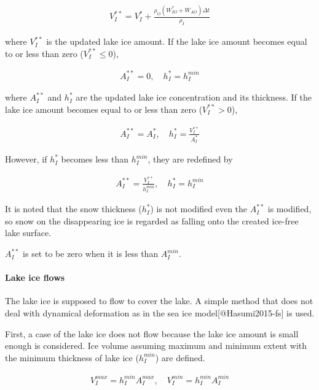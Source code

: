 \begin{eqnarray}
    V_I^{\ast\ast} = V_I^{\ast} + \frac{\rho_O (W_{IO}^\ast+W_{AO})\Delta t}{\rho_I}
\end{eqnarray}

where \(V_I^{\ast\ast}\) is the updated lake ice amount. If the lake ice amount becomes equal to or less than zero (\(V_I^{\ast\ast}\le0\)),

\begin{eqnarray}
  A_I^{\ast\ast}=0, \quad h_I^{\ast}=h_I^{min}
\end{eqnarray}

where \(A_I^{\ast\ast}\) and \(h_I^\ast\) are the updated lake ice concentration and its thickness. If the lake ice amount becomes equal to or less than zero (\(V_I^{\ast\ast}>0\)),

\begin{eqnarray}
  A_I^{\ast\ast}=A_I^\ast, \quad h_I^{\ast}=\frac{V_{I}^{\ast\ast}}{A_I^{\ast}}
\end{eqnarray}

However, if \(h_I^{\ast}\) becomes less than \(h_I^{min}\), they are redefined by

\begin{eqnarray}
  A_I^{\ast\ast}=\frac{V_I^{\ast\ast}}{h_I^{min}},\quad h_I^{\ast} = h_I^{min}
\end{eqnarray}

It is noted that the snow thickness (\(h_I^{\ast}\)) is not modified even the \(A_I^{\ast\ast}\) is modified, so snow on the disappearing ice is regarded as falling onto the created ice-free lake
surface.

\(A_I^{\ast\ast}\) is set to be zero when it is less than \(A_I^{min}\).

\hypertarget{lake-ice-flows}{%
\paragraph{Lake ice flows}\label{lake-ice-flows}}

The lake ice is supposed to flow to cover the lake. A simple method that does not deal with dynamical deformation as in the sea ice model{[}@Hasumi2015-fs{]} is used.

First, a case of the lake ice does not flow because the lake ice amount is small enough is considered. Ice volume assuming maximum and minimum extent with the minimum thickness of lake ice
(\(h_I^{min}\)) are defined.

\begin{eqnarray}
  V_I^{max} = h_I^{min}A_I^{max}, \quad V_I^{min} = h_I^{min}A_I^{min}
\end{eqnarray}

